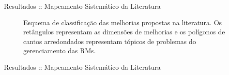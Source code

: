 \documentclass[t,14pt,mathserif]{beamer}
\begin{document}
\begin{frame}{Resultados :: Mapeamento Sistemático da Literatura}

    \begin{figure}[tb] \centering
        \caption{Esquema de classificação das melhorias propostas na literatura.
            Os retângulos representam as dimensões de melhorias e os polígonos
            de cantos arredondados representam tópicos de problemas do
            gerenciamento das RMs.}\label{fig:diagrama-esquema-dimensao-melhorias}
    \end{figure}
\end{frame}

\begin{frame}{Resultados :: Mapeamento Sistemático da Literatura}

    \begin{table}[htpb]
    \centering
    \caption{Total de artigos por papel na manutenção de software}
\label{tab:graf_papel_por_artigo}
    \end{table}

\end{frame}
\end{document}
